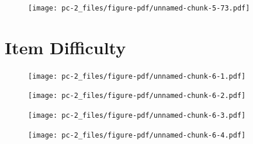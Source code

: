\documentclass[
  letterpaper,
  DIV=11,
  numbers=noendperiod]{scrreprt}
\newenvironment{Shaded}{\begin{snugshade}}{\end{snugshade}}
\newcommand{\AttributeTok}[1]{\textcolor[rgb]{0.40,0.45,0.13}{#1}}
\newcommand{\ConstantTok}[1]{\textcolor[rgb]{0.56,0.35,0.01}{#1}}
\newcommand{\ControlFlowTok}[1]{\textcolor[rgb]{0.00,0.23,0.31}{#1}}
\newcommand{\DecValTok}[1]{\textcolor[rgb]{0.68,0.00,0.00}{#1}}
\newcommand{\FunctionTok}[1]{\textcolor[rgb]{0.28,0.35,0.67}{#1}}
\newcommand{\NormalTok}[1]{\textcolor[rgb]{0.00,0.23,0.31}{#1}}
\newcommand{\OtherTok}[1]{\textcolor[rgb]{0.00,0.23,0.31}{#1}}
\newcommand{\SpecialCharTok}[1]{\textcolor[rgb]{0.37,0.37,0.37}{#1}}
\begin{document}
\begin{figure}[H]

{\centering \texttt{[image: pc-2\_files/figure-pdf/unnamed-chunk-5-73.pdf]}

}

\end{figure}

\hypertarget{item-difficulty}{%
\section{Item Difficulty}\label{item-difficulty}}

\begin{Shaded}
\end{Shaded}

\begin{figure}[H]

{\centering \texttt{[image: pc-2\_files/figure-pdf/unnamed-chunk-6-1.pdf]}

}

\end{figure}

\begin{figure}[H]

{\centering \texttt{[image: pc-2\_files/figure-pdf/unnamed-chunk-6-2.pdf]}

}

\end{figure}

\begin{figure}[H]

{\centering \texttt{[image: pc-2\_files/figure-pdf/unnamed-chunk-6-3.pdf]}

}

\end{figure}

\begin{figure}[H]

{\centering \texttt{[image: pc-2\_files/figure-pdf/unnamed-chunk-6-4.pdf]}

}

\end{figure}
\end{document}
